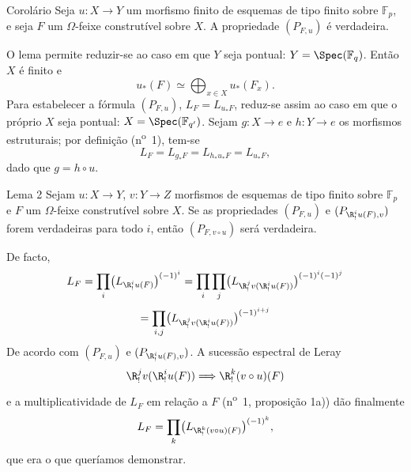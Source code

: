 \begin{statement}{Corolário}
Seja $u:X\to Y$ um morfismo finito de esquemas de tipo finito sobre $\mathbb F_p$, e seja $F$ um $\Omega$-feixe construtível sobre $X$. A propriedade $(P_{F,u})$ é verdadeira.
\end{statement}

O lema permite reduzir-se ao caso em que $Y$ seja pontual: $Y=\Spec(\mathbb F_q)$. Então $X$ é finito e
\[
u_*(F)\simeq \bigoplus_{x\in X}u_*(F_x).
\]
Para estabelecer a fórmula $(P_{F,u})$, $L_F=L_{u_*F}$, reduz-se assim ao caso em que o próprio $X$ seja pontual: $X=\Spec(\mathbb F_{q'})$. Sejam $g:X\to e$ e $h:Y\to e$ os morfismos estruturais; por definição (n\textsuperscript{o}~1), tem-se
\[
L_F=L_{g_*F}=L_{h_*u_*F}=L_{u_*F},
\]
dado que $g=h\circ u$.

\begin{statement}{Lema 2}
Sejam $u:X\to Y$, $v:Y\to Z$ morfismos de esquemas de tipo finito sobre $\mathbb F_p$ e $F$ um $\Omega$-feixe construtível sobre $X$. Se as propriedades $(P_{F,u})$ e $(P_{\R^i_!u(F),v})$ forem verdadeiras para todo $i$, então $(P_{F,v\circ u})$ será verdadeira.
\end{statement}

De facto,
\[
L_F=\prod_i\bigl(L_{\R^i_!u(F)}\bigr)^{(-1)^i}
 =\prod_i\prod_j\bigl(L_{\R^j_!v(\R^i_!u(F))}\bigr)^{(-1)^i(-1)^j}
\]
\[
=\prod_{i,j}\bigl(L_{\R^j_!v(\R^i_!u(F))}\bigr)^{(-1)^{i+j}}
\]
De acordo com $(P_{F,u})$ e $(P_{\R^i_!u(F),v})$. A sucessão espectral de Leray
\[
\R^j_!v(\R^i_!u(F))\Longrightarrow \R^k_!(v\circ u)(F)
\]
e a multiplicatividade de $L_F$ em relação a $F$ (n\textsuperscript{o}~1, proposição 1a)) dão finalmente
\[
L_F=\prod_k\bigl(L_{\R^k_!(v\circ u)(F)}\bigr)^{(-1)^k},
\]
que era o que queríamos demonstrar.
